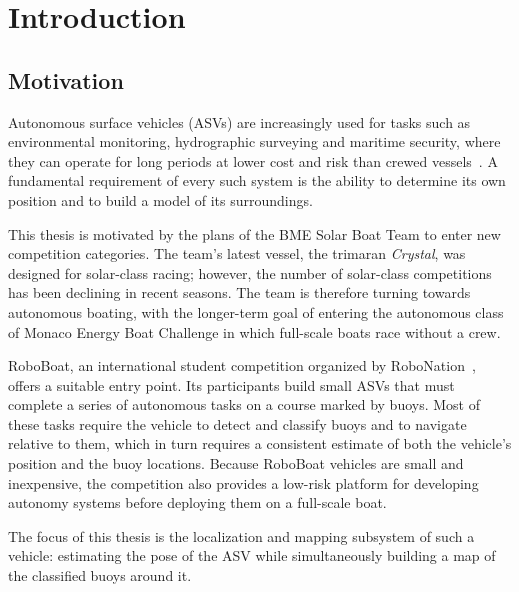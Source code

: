 \chapter{Introduction}
\label{chap:introduction}

\section{Motivation}
\label{sec:introduction-motivation}

Autonomous surface vehicles (ASVs) are increasingly used for tasks such as
environmental monitoring, hydrographic surveying and maritime security, where
they can operate for long periods at lower cost and risk than crewed
vessels~\cite{TODO-asv-overview}. A fundamental requirement of every such
system is the ability to determine its own position and to build a model of
its surroundings.

This thesis is motivated by the plans of the BME Solar Boat Team to enter new
competition categories. The team's latest vessel, the trimaran
\textit{Crystal}, was designed for solar-class racing; however, the number of
solar-class competitions has been declining in recent seasons. The team is
therefore turning towards autonomous boating, with the longer-term goal of
entering the autonomous class of Monaco Energy Boat Challenge in which full-scale
boats race without a crew.

RoboBoat, an international student competition organized by
RoboNation~\cite{TODO-roboboat-handbook}, offers a suitable entry point. Its
participants build small ASVs that must complete a series of autonomous tasks
on a course marked by buoys. Most of these tasks require the vehicle to detect
and classify buoys and to navigate relative to them, which in turn requires a
consistent estimate of both the vehicle's position and the buoy locations.
Because RoboBoat vehicles are small and inexpensive, the competition also
provides a low-risk platform for developing autonomy systems before deploying
them on a full-scale boat.

The focus of this thesis is the localization and mapping subsystem of such a
vehicle: estimating the pose of the ASV while simultaneously building a map of
the classified buoys around it.


